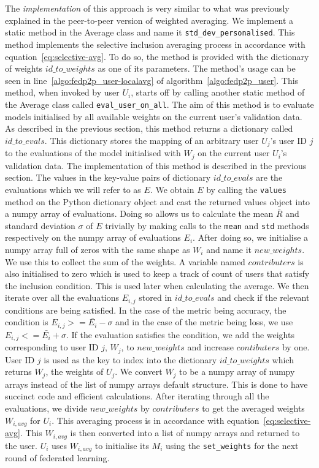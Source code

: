 \documentclass[12pt]{article}
\begin{document}
\\\\
The \textit{implementation} of this approach is very similar to what was previously explained in the peer-to-peer version of weighted averaging. We implement a static method in the Average class and name it \texttt{std\_dev\_personalised}. This method implements the selective inclusion averaging process in accordance with equation~\ref{eq:selective-avg}. To do so, the method is provided with the dictionary of weights $id\_to\_weights$ as one of its parameters. The method's usage can be seen in line~\ref{algo:fedp2p_user-localavg} of algorithm~\ref{algo:fedp2p_user}. This method, when invoked by user $U_i$, starts off by calling another static method of the Average class called \texttt{eval\_user\_on\_all}. The aim of this method is to evaluate models initialised by all available weights on the current user's validation data. As described in the previous section, this method returns a dictionary called $id\_to\_evals$. This dictionary stores the mapping of an arbitrary user $U_j$'s user ID $j$ to the evaluations of the model initialised with $W_j$ on the current user $U_i$'s validation data. The implementation of this method is described in the previous section. The values in the key-value pairs of dictionary $id\_to\_evals$ are the evaluations which we will refer to as $E$. We obtain $E$ by calling the \texttt{values} method on the Python dictionary object and cast the returned values object into a numpy array of evaluations. Doing so allows us to calculate the mean $\bar{R}$ and standard deviation $\sigma$ of $E$ trivially by making calls to the \texttt{mean} and \texttt{std} methods respectively on the numpy array of evaluations $E_i$. After doing so, we initialise a numpy array full of zeros with the same shape as $W_i$ and name it $new\_weights$. We use this to collect the sum of the weights. A variable named $contributers$ is also initialised to zero which is used to keep a track of count of users that satisfy the inclusion condition. This is used later when calculating the average. We then iterate over all the evaluations $E_{i,j}$ stored in $id\_to\_evals$ and check if the relevant conditions are being satisfied. In the case of the metric being accuracy, the condition is $E_{i,j} >= \bar{E_i}-\sigma$ and in the case of the metric being loss, we use $E_{i,j} <= \bar{E_i}+\sigma$. If the evaluation satisfies the condition, we add the weights corresponding to user ID $j$, $W_j$, to $new\_weights$ and increase $contibuters$ by one. User ID $j$ is used as the key to index into the dictionary $id\_to\_weights$ which returns $W_j$, the weights of $U_j$. We convert $W_j$ to be a numpy array of numpy arrays instead of the list of numpy arrays default structure. This is done to have succinct code and efficient calculations. After iterating through all the evaluations, we divide $new\_weights$ by $contributers$ to get the averaged weights $W_{i,avg}$ for $U_i$. This averaging process is in accordance with equation~\ref{eq:selective-avg}. This $W_{i,avg}$ is then converted into a list of numpy arrays and returned to the user. $U_i$ uses $W_{i,avg}$ to initialise its $M_i$ using the \texttt{set\_weights} for the next round of federated learning. 
\end{document}
